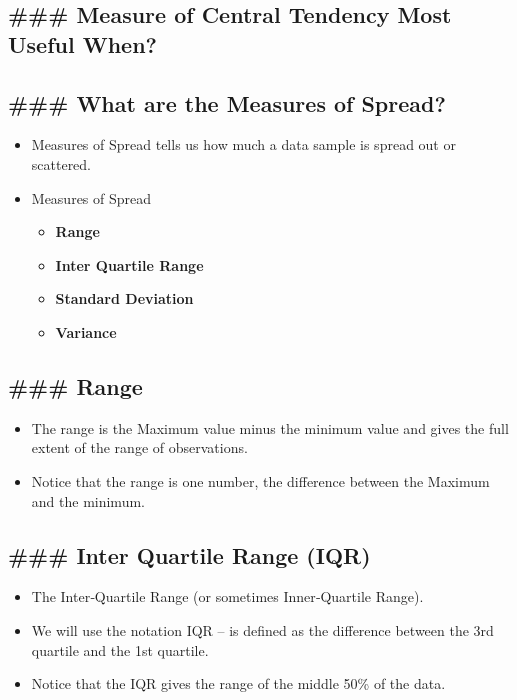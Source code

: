\documentclass[11pt]{article}
\providecommand{\tightlist}{%
      \setlength{\itemsep}{0pt}\setlength{\parskip}{0pt}}
\begin{document}
    \subsection{\#\#\# Measure of Central Tendency Most Useful
When?}\label{measure-of-central-tendency-most-useful-when}

    

    \subsection{\#\#\# What are the Measures of
Spread?}\label{what-are-the-measures-of-spread}

    \begin{itemize}
\tightlist
\item
  Measures of Spread tells us how much a data sample is spread out or
  scattered.
\item
  Measures of Spread

  \begin{itemize}
  \tightlist
  \item
    \textbf{Range}
  \item
    \textbf{Inter Quartile Range}
  \item
    \textbf{Standard Deviation}
  \item
    \textbf{Variance}
  \end{itemize}
\end{itemize}

    \subsection{\#\#\# Range}\label{range}

    \begin{itemize}
\tightlist
\item
  The range is the Maximum value minus the minimum value and gives the
  full extent of the range of observations.
\item
  Notice that the range is one number, the difference between the
  Maximum and the minimum.
\end{itemize}

    \subsection{\#\#\# Inter Quartile Range
(IQR)}\label{inter-quartile-range-iqr}

    \begin{itemize}
\tightlist
\item
  The Inter‐Quartile Range (or sometimes Inner‐Quartile Range).
\item
  We will use the notation IQR -- is defined as the difference between
  the 3rd quartile and the 1st quartile.
\item
  Notice that the IQR gives the range of the middle 50\% of the data.
\end{itemize}
\end{document}
